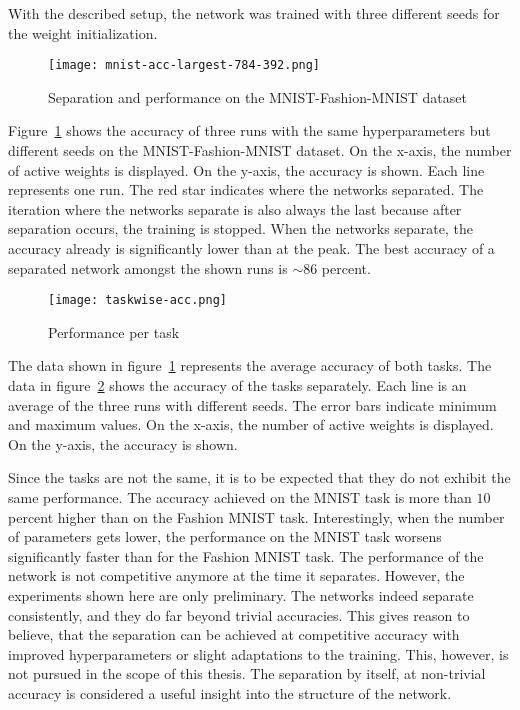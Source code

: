 With the described setup, the network was trained with three different seeds for the weight initialization.
\begin{figure}[ht]
    \centering
    \texttt{[image: mnist-acc-largest-784-392.png]}
    \caption{
        Separation and performance on the MNIST-Fashion-MNIST dataset
    }\label{fig:mnist-acc}
\end{figure}

Figure~\ref{fig:mnist-acc} shows the accuracy of three runs with the same hyperparameters but different seeds on the MNIST-Fashion-MNIST dataset.
On the x-axis, the number of active weights is displayed.
On the y-axis, the accuracy is shown.
Each line represents one run.
The red star indicates where the networks separated.
The iteration where the networks separate is also always the last because after separation occurs, the training is stopped.
When the networks separate, the accuracy already is significantly lower than at the peak.
The best accuracy of a separated network amongst the shown runs is $\sim86$ percent.

\begin{figure}[ht]
    \centering
    \texttt{[image: taskwise-acc.png]}
    \caption{
        Performance per task
    }\label{fig:taskwise-acc}
\end{figure}

The data shown in figure~\ref{fig:mnist-acc} represents the average accuracy of both tasks.
The data in figure~\ref{fig:taskwise-acc} shows the accuracy of the tasks separately.
Each line is an average of the three runs with different seeds.
The error bars indicate minimum and maximum values.
On the x-axis, the number of active weights is displayed.
On the y-axis, the accuracy is shown.

Since the tasks are not the same, it is to be expected that they do not exhibit the same performance.
The accuracy achieved on the MNIST task is more than $10$ percent higher than on the Fashion MNIST task.
Interestingly, when the number of parameters gets lower, the performance on the MNIST task worsens significantly faster than for the Fashion MNIST task.
The performance of the network is not competitive anymore at the time it separates.
However, the experiments shown here are only preliminary.
The networks indeed separate consistently, and they do far beyond trivial accuracies.
This gives reason to believe, that the separation can be achieved at competitive accuracy with improved hyperparameters or slight adaptations to the training.
This, however, is not pursued in the scope of this thesis.
The separation by itself, at non-trivial accuracy is considered a useful insight into the structure of the network.


